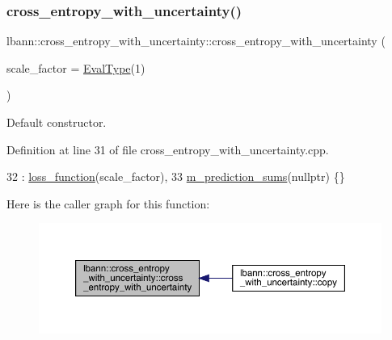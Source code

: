 \subsubsection{\texorpdfstring{cross\+\_\+entropy\+\_\+with\+\_\+uncertainty()}{cross\_entropy\_with\_uncertainty()}\hspace{0.1cm}{\footnotesize\ttfamily [1/2]}}
{\footnotesize\ttfamily lbann\+::cross\+\_\+entropy\+\_\+with\+\_\+uncertainty\+::cross\+\_\+entropy\+\_\+with\+\_\+uncertainty (\begin{DoxyParamCaption}\item[{\hyperlink{base_8hpp_a3266f5ac18504bbadea983c109566867}{Eval\+Type}}]{scale\+\_\+factor = {\ttfamily \hyperlink{base_8hpp_a3266f5ac18504bbadea983c109566867}{Eval\+Type}(1)} }\end{DoxyParamCaption})}

Default constructor. 

Definition at line 31 of file cross\+\_\+entropy\+\_\+with\+\_\+uncertainty.\+cpp.


\begin{DoxyCode}
32   : \hyperlink{classlbann_1_1loss__function_a0c5745e661c59e3e5496888d233c07cf}{loss\_function}(scale\_factor),
33     \hyperlink{classlbann_1_1cross__entropy__with__uncertainty_a4b45767c526e7ebe4a55ff1a1ddbd7ba}{m\_prediction\_sums}(\textcolor{keyword}{nullptr}) \{\}
\end{DoxyCode}
Here is the caller graph for this function\+:\nopagebreak
\begin{figure}[H]
\begin{center}
\leavevmode
\includegraphics[width=350pt]{classlbann_1_1cross__entropy__with__uncertainty_a93f0ab9861859a3b54fc5c723a27aaaa_icgraph}
\end{center}
\end{figure}
\mbox{\label{classlbann_1_1cross__entropy__with__uncertainty_ae6d8025fb046ae3bd3d05321fb1b40d4}} 
